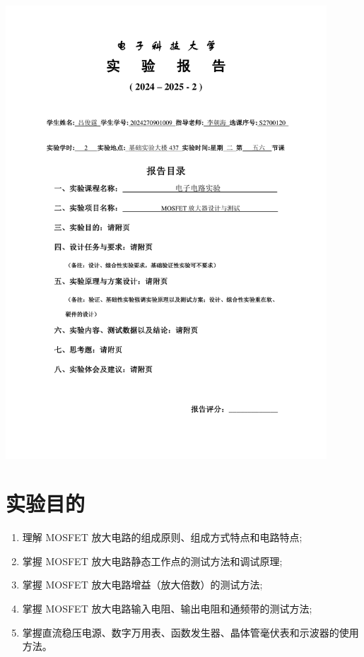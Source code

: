 \documentclass[10pt, a4paper]{article} %
\begin{document}
\begin{titlepage}
    \centering
    \includegraphics[page=1, width=0.9\textwidth, keepaspectratio]{image/实验报告撰写封面.pdf}
    \restoregeometry
\end{titlepage}

\setcounter{section}{2}

\section{实验目的}

\begin{enumerate}[leftmargin=50pt,label=(\arabic*)] %
    \item 理解 MOSFET 放大电路的组成原则、组成方式特点和电路特点; 
    \item 掌握 MOSFET 放大电路静态工作点的测试方法和调试原理; 
    \item 掌握 MOSFET 放大电路增益（放大倍数）的测试方法;
    \item 掌握 MOSFET 放大电路输入电阻、输出电阻和通频带的测试方法;
    \item 掌握直流稳压电源、数字万用表、函数发生器、晶体管毫伏表和示波器的使用方法。
\end{enumerate}
\end{document}

